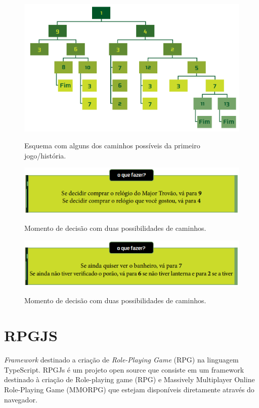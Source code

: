         \begin{figure}
            \centering
            \caption{Esquema com alguns dos caminhos possíveis da primeiro jogo/história.}
            \includegraphics[scale=0.3]{Textuais/Pictures/Picture1.png}
            \label{fig:figure-1}
        \end{figure}
        \begin{figure}
            \centering
            \caption{Momento de decisão com duas possibilidades de caminhos.}
            \includegraphics[scale=1]{Textuais/Pictures/Picture2.png}
            \label{fig:figure-2}
        \end{figure}
        \begin{figure}
            \centering
            \caption{Momento de decisão com duas possibilidades de caminhos.}
            \includegraphics[scale=1]{Textuais/Pictures/Picture3.png}
            \label{fig:figure-3}
        \end{figure}

    \section{RPGJS}
        \textit{Framework} destinado a criação de \textit{Role-Playing Game} (RPG) na linguagem TypeScript.
        RPGJs é um projeto open source que consiste em um framework destinado à criação de Role-playing game (RPG) e
        Massively Multiplayer Online Role-Playing Game (MMORPG) que estejam disponíveis diretamente através do navegador.

